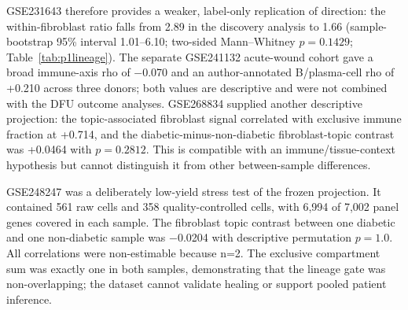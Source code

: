 

GSE231643 therefore provides a weaker, label-only replication of direction: the within-fibroblast ratio falls from 2.89 in the discovery analysis to 1.66 (sample-bootstrap 95\% interval 1.01--6.10; two-sided Mann--Whitney $p=0.1429$; Table~\ref{tab:p1lineage}). The separate GSE241132 acute-wound cohort gave a broad immune-axis rho of −0.070 and an author-annotated B/plasma-cell rho of +0.210 across three donors; both values are descriptive and were not combined with the DFU outcome analyses. GSE268834 supplied another descriptive projection: the topic-associated fibroblast signal correlated with exclusive immune fraction at +0.714, and the diabetic-minus-non-diabetic fibroblast-topic contrast was +0.0464 with $p=0.2812$. This is compatible with an immune/tissue-context hypothesis but cannot distinguish it from other between-sample differences.

GSE248247 was a deliberately low-yield stress test of the frozen projection. It contained 561 raw cells and 358 quality-controlled cells, with 6,994 of 7,002 panel genes covered in each sample. The fibroblast topic contrast between one diabetic and one non-diabetic sample was −0.0204 with descriptive permutation $p=1.0$. All correlations were non-estimable because n=2. The exclusive compartment sum was exactly one in both samples, demonstrating that the lineage gate was non-overlapping; the dataset cannot validate healing or support pooled patient inference.

